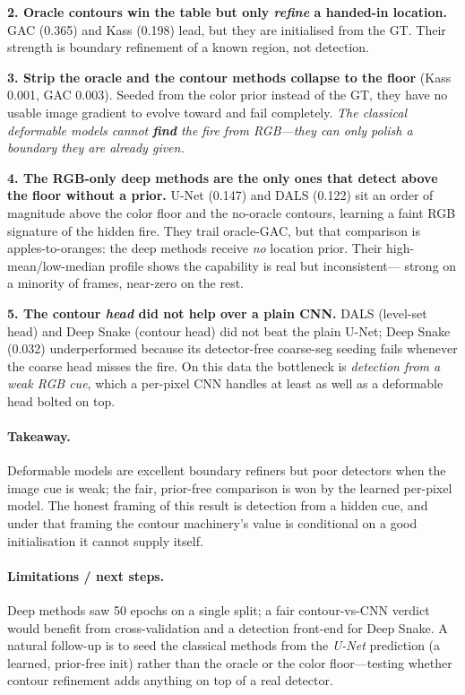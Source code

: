\documentclass[10pt]{article}
\begin{document}
\textbf{2. Oracle contours win the table but only \emph{refine} a handed-in
location.} GAC (0.365) and Kass (0.198) lead, but they are initialised from the
GT. Their strength is boundary refinement of a known region, not detection.

\textbf{3. Strip the oracle and the contour methods collapse to the floor}
(Kass 0.001, GAC 0.003). Seeded from the color prior instead of the GT, they have
no usable image gradient to evolve toward and fail completely. \emph{The
classical deformable models cannot \textbf{find} the fire from RGB---they can
only polish a boundary they are already given.}

\textbf{4. The RGB-only deep methods are the only ones that detect above the
floor without a prior.} U-Net (0.147) and DALS (0.122) sit an order of magnitude
above the color floor and the no-oracle contours, learning a faint RGB
signature of the hidden fire. They trail oracle-GAC, but that comparison is
apples-to-oranges: the deep methods receive \emph{no} location prior. Their
high-mean/low-median profile shows the capability is real but inconsistent---
strong on a minority of frames, near-zero on the rest.

\textbf{5. The contour \emph{head} did not help over a plain CNN.} DALS
(level-set head) and Deep Snake (contour head) did not beat the plain U-Net;
Deep Snake (0.032) underperformed because its detector-free coarse-seg seeding
fails whenever the coarse head misses the fire. On this data the bottleneck is
\emph{detection from a weak RGB cue}, which a per-pixel CNN handles at least as
well as a deformable head bolted on top.

\paragraph{Takeaway.} Deformable models are excellent boundary refiners but poor
detectors when the image cue is weak; the fair, prior-free comparison is won by
the learned per-pixel model. The honest framing of this result is detection from
a hidden cue, and under that framing the contour machinery's value is conditional
on a good initialisation it cannot supply itself.

\paragraph{Limitations / next steps.} Deep methods saw 50 epochs on a single
split; a fair contour-vs-CNN verdict would benefit from cross-validation and a
detection front-end for Deep Snake. A natural follow-up is to seed the classical
methods from the \emph{U-Net} prediction (a learned, prior-free init) rather than
the oracle or the color floor---testing whether contour refinement adds anything
on top of a real detector.
\end{document}
